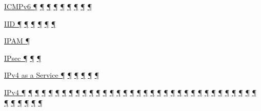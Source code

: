 \documentclass[
]{article}
\begin{document}
\hyperref[address-resolution]{ICMPv6 ¶} \hyperref[auto-configuration]{¶}
\hyperref[extension-headers-and-options]{¶}
\hyperref[dual-stack-scenarios]{¶}
\hyperref[translation-and-ipv4-as-a-service]{¶} \hyperref[security]{¶}
\hyperref[filtering]{¶} \hyperref[troubleshooting]{¶}
\hyperref[advanced-troubleshooting]{¶}

\hyperref[addresses]{IID ¶}
\hyperref[ipv6-primary-differences-from-ipv4]{¶}
\hyperref[translation-and-ipv4-as-a-service]{¶}
\hyperref[layer-2-considerations]{¶}
\hyperref[multi-prefix-operation]{¶} \hyperref[multihoming]{¶}

\hyperref[address-and-prefix-management]{IPAM ¶}

\hyperref[extension-headers-and-options]{IPsec ¶}
\hyperref[packet-format]{¶} \hyperref[security]{¶}

\hyperref[coexistence-with-legacy-ipv4]{IPv4 as a Service ¶}
\hyperref[dual-stack-scenarios]{¶}
\hyperref[translation-and-ipv4-as-a-service]{¶}
\hyperref[network-design]{¶} \hyperref[multihoming]{¶}
\hyperref[deployment-in-the-home]{¶}

\hyperref[how-a-network-operations-center-sees-ipv6]{IPv4 ¶}
\hyperref[how-an-application-programmer-sees-ipv6]{¶}
\hyperref[why-version-6]{¶} \hyperref[address-resolution]{¶}
\hyperref[addresses]{¶} \hyperref[dns]{¶}
\hyperref[extension-headers-and-options]{¶}
\hyperref[layer-2-functions]{¶} \hyperref[managed-configuration]{¶}
\hyperref[routing]{¶}
\hyperref[source-and-destination-address-selection]{¶}
\hyperref[traffic-class-and-flow-label]{¶}
\hyperref[transport-protocols]{¶}
\hyperref[coexistence-with-legacy-ipv4]{¶}
\hyperref[dual-stack-scenarios]{¶}
\hyperref[ipv6-primary-differences-from-ipv4]{¶}
\hyperref[obsolete-techniques]{¶}
\hyperref[translation-and-ipv4-as-a-service]{¶} \hyperref[tunnels]{¶}
\hyperref[security]{¶} \hyperref[filtering]{¶}
\hyperref[layer-2-considerations]{¶} \hyperref[topology-obfuscation]{¶}
\hyperref[network-design]{¶} \hyperref[address-planning]{¶}
\hyperref[address-and-prefix-management]{¶}
\hyperref[benchmarking-and-monitoring]{¶}
\hyperref[energy-consumption]{¶} \hyperref[multi-prefix-operation]{¶}
\hyperref[multihoming]{¶} \hyperref[packet-size-and-jumbo-frames]{¶}
\hyperref[routing-operation]{¶} \hyperref[cern-and-the-lhc]{¶}
\hyperref[deployment-by-carriers]{¶}
\hyperref[deployment-in-the-home]{¶} \hyperref[status]{¶}
\hyperref[troubleshooting]{¶} \hyperref[advanced-troubleshooting]{¶}
\hyperref[tools]{¶} \hyperref[obsolete-features-in-ipv6]{¶}
\hyperref[further-reading]{¶}
\end{document}
